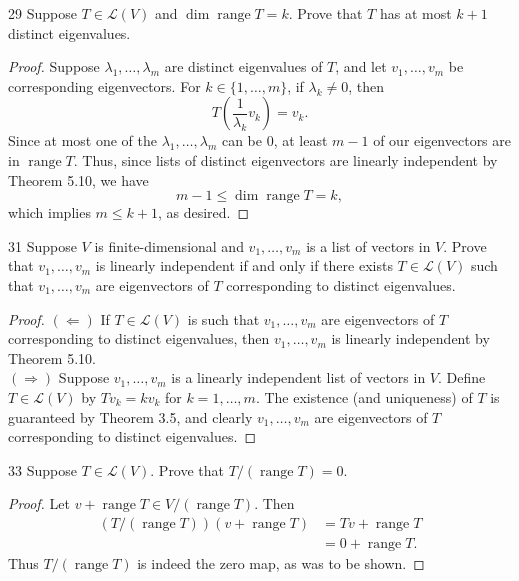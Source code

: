 \documentclass{extarticle}
\newenvironment{problem}[1]{\begin{prob*}{#1}{}}{\end{prob*}}
\newcommand{\Hom}{\mathcal{L}}
\DeclareMathOperator{\Range}{range}
\begin{document}
\begin{problem}{29}
Suppose $T\in\Hom(V)$ and $\dim\Range T = k$.  Prove that $T$ has at most $k + 1$ distinct eigenvalues.
\end{problem}
\begin{proof}
Suppose $\lambda_1,\dots, \lambda_m$ are distinct eigenvalues of $T$, and let $v_1,\dots, v_m$ be corresponding eigenvectors.  For $k\in\{1,\dots,m\}$, if $\lambda_k\neq 0$, then 
\begin{equation*}
T\left(\frac{1}{\lambda_k} v_k\right) = v_k.
\end{equation*}
Since at most one of the $\lambda_1,\dots, \lambda_m$ can be $0$, at least $m-1$ of our eigenvectors are in $\Range T$.  Thus, since lists of distinct eigenvectors are linearly independent by Theorem 5.10, we have
\begin{equation*}
m-1\leq \dim\Range T = k,
\end{equation*}
which implies $m\leq k+1$, as desired.
\end{proof}

\begin{problem}{31}
Suppose $V$ is finite-dimensional and $v_1,\dots,v_m$ is a list of vectors in $V$.  Prove that $v_1,\dots,v_m$ is linearly independent if and only if there exists $T\in\Hom(V)$ such that $v_1,\dots,v_m$ are eigenvectors of $T$ corresponding to distinct eigenvalues.
\end{problem}
\begin{proof}
$(\Leftarrow)$ If $T\in \Hom(V)$ is such that $v_1,\dots,v_m$ are eigenvectors of $T$ corresponding to distinct eigenvalues, then $v_1,\dots,v_m$ is linearly independent by Theorem 5.10.\\
\indent $(\Rightarrow)$ Suppose $v_1,\dots,v_m$ is a linearly independent list of vectors in $V$.  Define $T\in\Hom(V)$ by $Tv_k = kv_k$ for $k = 1,\dots, m$.  The existence (and uniqueness) of $T$ is guaranteed by Theorem 3.5, and clearly $v_1,\dots, v_m$ are eigenvectors of $T$ corresponding to distinct eigenvalues.  
\end{proof}

\begin{problem}{33}
Suppose $T\in\Hom(V)$.  Prove that $T/(\Range T) = 0$. 
\end{problem}
\begin{proof}
Let $v + \Range T\in V/(\Range T)$.  Then
\begin{align*}
(T/(\Range T))(v + \Range T) &= Tv + \Range T\\
&= 0 + \Range T.
\end{align*}
Thus $T/(\Range T)$ is indeed the zero map, as was to be shown.
\end{proof}
\end{document}
